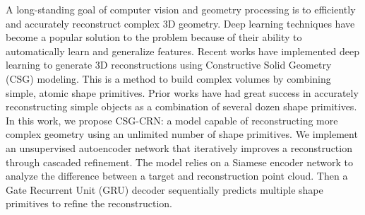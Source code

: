 
A long-standing goal of computer vision and geometry processing is to efficiently and accurately reconstruct complex 3D geometry. Deep learning techniques have become a popular solution to the problem because of their ability to automatically learn and generalize features. Recent works have implemented deep learning to generate 3D reconstructions using Constructive Solid Geometry (CSG) modeling. This is a method to build complex volumes by combining simple, atomic shape primitives. Prior works have had great success in accurately reconstructing simple objects as a combination of several dozen shape primitives. In this work, we propose CSG-CRN: a model capable of reconstructing more complex geometry using an unlimited number of shape primitives. We implement an unsupervised autoencoder network that iteratively improves a reconstruction through cascaded refinement. The model relies on a Siamese encoder network to analyze the difference between a target and reconstruction point cloud. Then a Gate Recurrent Unit (GRU) decoder sequentially predicts multiple shape primitives to refine the reconstruction.

\vspace{2em}

